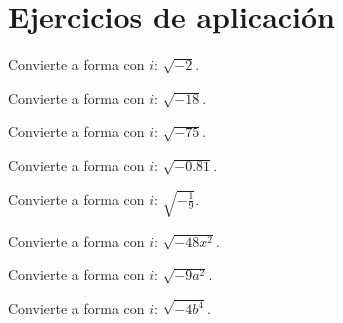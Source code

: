 
\section*{Ejercicios de aplicación}



\begin{ejercicio}
Convierte a forma con $i$: $\displaystyle \sqrt{-2}$.
\end{ejercicio}

\begin{ejercicio}
Convierte a forma con $i$: $\displaystyle \sqrt{-18}$.
\end{ejercicio}

\begin{ejercicio}
Convierte a forma con $i$: $\displaystyle \sqrt{-75}$.
\end{ejercicio}

\begin{ejercicio}
Convierte a forma con $i$: $\displaystyle \sqrt{-0.81}$.
\end{ejercicio}

\begin{ejercicio}
Convierte a forma con $i$: $\displaystyle \sqrt{-\tfrac{1}{9}}$.
\end{ejercicio}

\begin{ejercicio}
Convierte a forma con $i$: $\displaystyle \sqrt{-48x^{2}}$.
\end{ejercicio}

\begin{ejercicio}
Convierte a forma con $i$: $\displaystyle \sqrt{-9a^{2}}$.
\end{ejercicio}

\begin{ejercicio}
Convierte a forma con $i$: $\displaystyle \sqrt{-4b^{4}}$.
\end{ejercicio}

